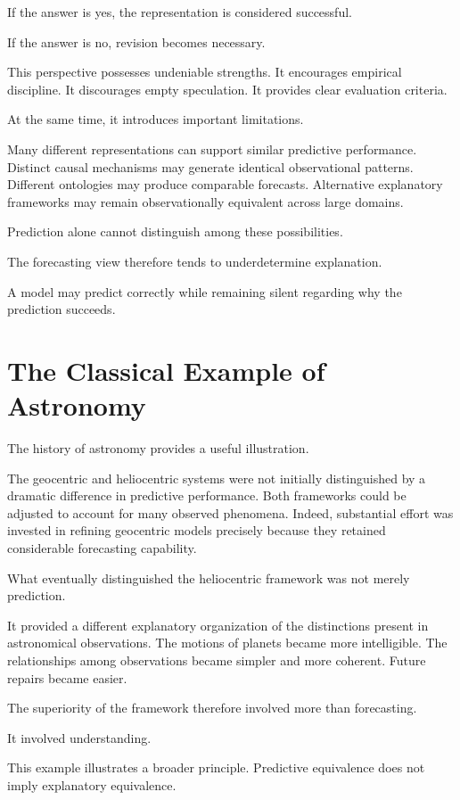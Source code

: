 \documentclass[11pt,oneside,openany]{book}
\begin{document}
If the answer is yes, the representation is considered successful.

If the answer is no, revision becomes necessary.

This perspective possesses undeniable strengths. It encourages empirical discipline. It discourages empty speculation. It provides clear evaluation criteria.

At the same time, it introduces important limitations.

Many different representations can support similar predictive performance. Distinct causal mechanisms may generate identical observational patterns. Different ontologies may produce comparable forecasts. Alternative explanatory frameworks may remain observationally equivalent across large domains.

Prediction alone cannot distinguish among these possibilities.

The forecasting view therefore tends to underdetermine explanation.

A model may predict correctly while remaining silent regarding why the prediction succeeds.

\section{The Classical Example of Astronomy}

The history of astronomy provides a useful illustration.

The geocentric and heliocentric systems were not initially distinguished by a dramatic difference in predictive performance. Both frameworks could be adjusted to account for many observed phenomena. Indeed, substantial effort was invested in refining geocentric models precisely because they retained considerable forecasting capability.

What eventually distinguished the heliocentric framework was not merely prediction.

It provided a different explanatory organization of the distinctions present in astronomical observations. The motions of planets became more intelligible. The relationships among observations became simpler and more coherent. Future repairs became easier.

The superiority of the framework therefore involved more than forecasting.

It involved understanding.

This example illustrates a broader principle. Predictive equivalence does not imply explanatory equivalence.
\end{document}
